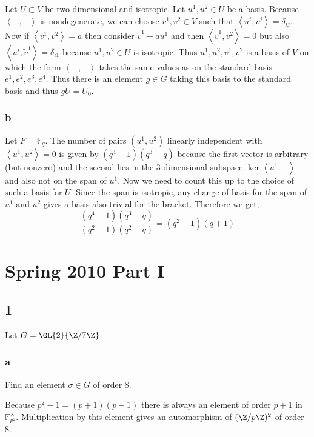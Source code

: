 \documentclass[12pt]{article}
\newcommand{\inner}[2]{\left< #1, #2 \right>}
\renewcommand{\F}{\mathbb{F}}
\begin{document}
Let $U \subset V$ be two dimensional and isotropic. Let $u^1, u^2 \in U$ be a basis. Because $\inner{-}{-}$ is nondegenerate, we can choose $v^1, v^2 \in V$ such that $\inner{u^i}{v^j} = \delta_{ij}$. Now if $\inner{v^1}{v^2} = a$ then consider $\tilde{v}^1 - a u^1$ and then $\inner{\tilde{v}^1}{v^2} = 0$ but also $\inner{u^i}{\tilde{v}^1} = \delta_{i1}$ because $u^1,u^2 \in U$ is isotropic. Thus $u^1, u^2, v^1, v^2$ is a basis of $V$ on which the form $\inner{-}{-}$ takes the same values as on the standard basis $e^1, e^2, e^3, e^4$. Thus there is an element $g \in G$ taking this basis to the standard basis and thus $g U = U_0$.

\subsubsection{b}

Let $F = \F_q$. The number of pairs $(u^1, u^2)$ linearly independent with $\inner{u^1}{u^2} = 0$ is given by $(q^4 - 1)(q^3 - q)$ because the first vector is arbitrary (but nonzero) and the second lies in the $3$-dimensional subspace $\ker{\inner{u^1}{-}}$ and also not on the span of $u^1$. Now we need to count this up to the choice of such a basis for $U$. Since the span is isotropic, any change of basis for the span of $u^1$ and $u^2$ gives a basis also trivial for the bracket. Therefore we get,
\[ \frac{(q^4 - 1)(q^3 - q)}{(q^2 - 1)(q^2 - q)} = (q^2 + 1)(q + 1) \]

\section{Spring 2010 Part I}

\subsection{1}

Let $G = \GL{2}{\Z/7\Z}$.

\subsubsection{a}

\begin{exercise}
Find an element $\sigma \in G$ of order $8$.
\end{exercise}

Because $p^2 -1 = (p + 1)(p-1)$ there is always an element of order $p + 1$ in $\mathbb{F}_{p^2}^\times$. Multiplication by this element gives an automorphism of $(\Z/p\Z)^2$ of order $8$.
\end{document}
